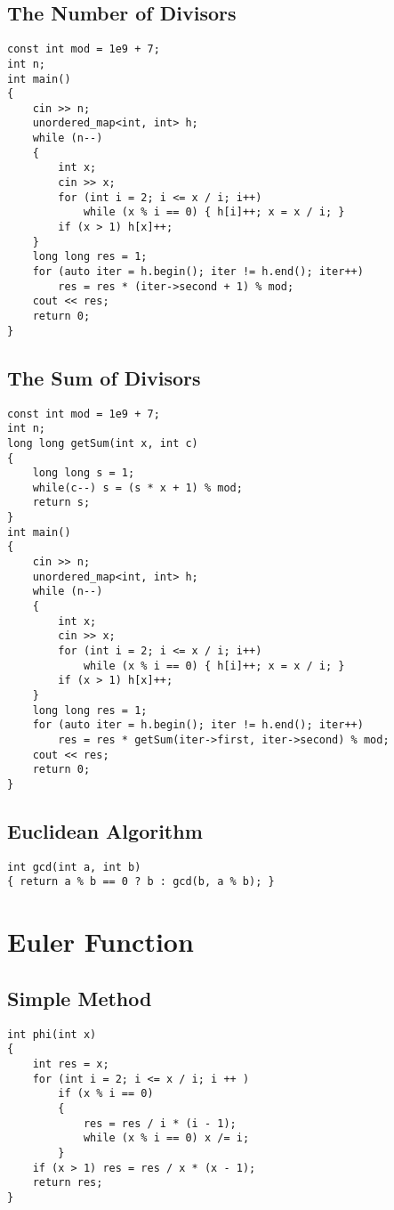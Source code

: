 \subsection{The Number of Divisors}
\begin{lstlisting}
const int mod = 1e9 + 7;
int n;
int main()
{
    cin >> n;
    unordered_map<int, int> h;
    while (n--)
    {
        int x;
        cin >> x;
        for (int i = 2; i <= x / i; i++)
            while (x % i == 0) { h[i]++; x = x / i; }
        if (x > 1) h[x]++;
    }
    long long res = 1;
    for (auto iter = h.begin(); iter != h.end(); iter++)
        res = res * (iter->second + 1) % mod;
    cout << res;
    return 0;
}
\end{lstlisting}
\subsection{The Sum of Divisors}
\begin{lstlisting}
const int mod = 1e9 + 7;
int n;
long long getSum(int x, int c)
{
    long long s = 1;
    while(c--) s = (s * x + 1) % mod;
    return s;
}
int main()
{
    cin >> n;
    unordered_map<int, int> h;
    while (n--)
    {
        int x;
        cin >> x;
        for (int i = 2; i <= x / i; i++)
            while (x % i == 0) { h[i]++; x = x / i; }
        if (x > 1) h[x]++;
    }
    long long res = 1;
    for (auto iter = h.begin(); iter != h.end(); iter++)
        res = res * getSum(iter->first, iter->second) % mod;
    cout << res;
    return 0;
}
\end{lstlisting}
\subsection{Euclidean Algorithm}
\begin{lstlisting}
int gcd(int a, int b) 
{ return a % b == 0 ? b : gcd(b, a % b); }
\end{lstlisting}
\section{Euler Function}
\subsection{Simple Method}
\begin{lstlisting}
int phi(int x)
{
    int res = x;
    for (int i = 2; i <= x / i; i ++ )
        if (x % i == 0)
        {
            res = res / i * (i - 1);
            while (x % i == 0) x /= i;
        }
    if (x > 1) res = res / x * (x - 1);
    return res;
}
\end{lstlisting}
